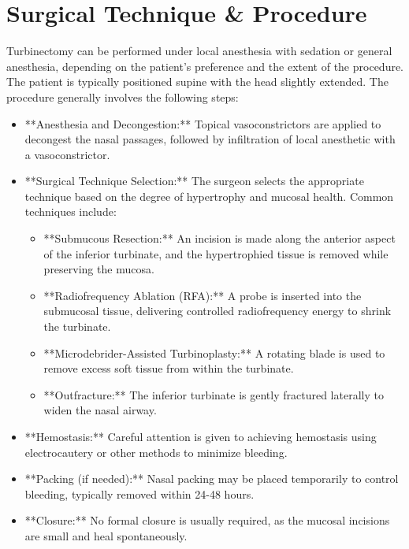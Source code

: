 \section*{Surgical Technique \& Procedure}
Turbinectomy can be performed under local anesthesia with sedation or general anesthesia, depending on the patient's preference and the extent of the procedure. The patient is typically positioned supine with the head slightly extended. The procedure generally involves the following steps:

\begin{itemize}
  \item **Anesthesia and Decongestion:** Topical vasoconstrictors are applied to decongest the nasal passages, followed by infiltration of local anesthetic with a vasoconstrictor.
  
  \item **Surgical Technique Selection:** The surgeon selects the appropriate technique based on the degree of hypertrophy and mucosal health. Common techniques include:
  
  \begin{itemize}
    \item **Submucous Resection:** An incision is made along the anterior aspect of the inferior turbinate, and the hypertrophied tissue is removed while preserving the mucosa.
    \item **Radiofrequency Ablation (RFA):** A probe is inserted into the submucosal tissue, delivering controlled radiofrequency energy to shrink the turbinate.
    \item **Microdebrider-Assisted Turbinoplasty:** A rotating blade is used to remove excess soft tissue from within the turbinate.
    \item **Outfracture:** The inferior turbinate is gently fractured laterally to widen the nasal airway.
  \end{itemize}
  
  \item **Hemostasis:** Careful attention is given to achieving hemostasis using electrocautery or other methods to minimize bleeding.
  
  \item **Packing (if needed):** Nasal packing may be placed temporarily to control bleeding, typically removed within 24-48 hours.
  
  \item **Closure:** No formal closure is usually required, as the mucosal incisions are small and heal spontaneously.
\end{itemize}

